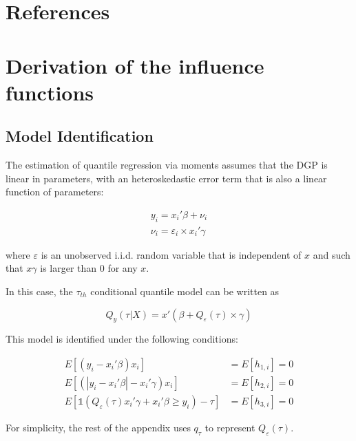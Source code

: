 \documentclass[
  authoryear,
  review,
  1p]{elsarticle}
\begin{document}
\section*{References}\label{references}

\renewcommand{\bibsection}{}


\newpage{}

\appendix

\section{Derivation of the influence
functions}\label{derivation-of-the-influence-functions}

\subsection{Model Identification}\label{model-identification}

The estimation of quantile regression via moments assumes that the DGP
is linear in parameters, with an heteroskedastic error term that is also
a linear function of parameters:

\[\begin{aligned}
y_i = x_i'\beta + \nu_i \\
\nu_i = \varepsilon_i \times x_i'\gamma
\end{aligned}
\]

where \(\varepsilon\) is an unobserved i.i.d. random variable that is
independent of \(x\) and such that \(x\gamma\) is larger than 0 for any
\(x\).

In this case, the \(\tau_{th}\) conditional quantile model can be
written as

\[Q_y(\tau|X) = x'(\beta +Q_\varepsilon(\tau)  \times \gamma)\]

This model is identified under the following conditions:

\[\begin{aligned}
  E[(y_i-x_i'\beta)x_i ]  &= E[h_{1,i}]=0 \\
  E[ (|y_i-x_i'\beta|-x_i' \gamma) x_i ] &=E[h_{2,i}]=0 \\
  E\left[  \mathbb{1}\left( Q_\varepsilon(\tau) x_i'\gamma +x_i'\beta\geq  y_i  \right) - \tau \right] 
   &=E[h_{3,i}]=0 
\end{aligned}
\]

For simplicity, the rest of the appendix uses \(q_\tau\) to represent
\(Q_\varepsilon(\tau)\).
\end{document}
